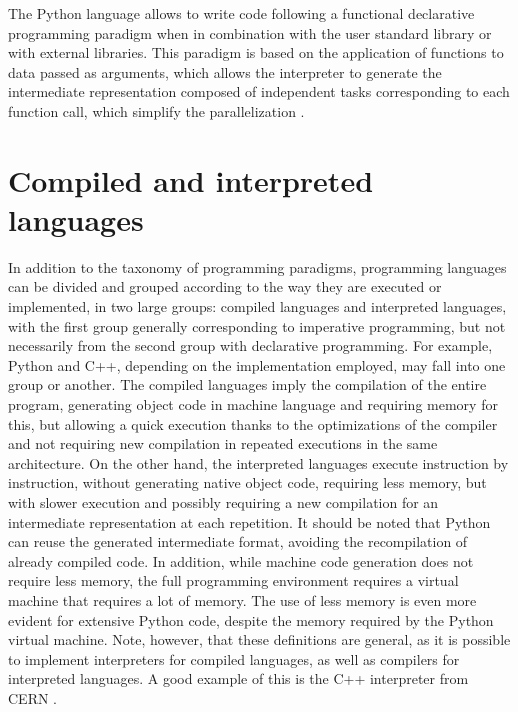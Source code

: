 The Python language allows to write code following a functional declarative programming paradigm when in combination with the user standard library or with external libraries. This paradigm is based on the application of functions to data passed as arguments, which allows the interpreter to generate the intermediate representation composed of independent tasks corresponding to each function call, which simplify the parallelization \cite {Singh2010}.

%
%
%
\section{Compiled and interpreted languages}

In addition to the taxonomy of programming paradigms, programming languages can be divided and grouped according to the way they are executed or implemented, in two large groups: compiled languages and interpreted languages, with the first group generally corresponding to imperative programming, but not necessarily from the second group with declarative programming. For example, Python and C++, depending on the implementation employed, may fall into one group or another. The compiled languages imply the compilation of the entire program, generating object code in machine language and requiring memory for this, but allowing a quick execution thanks to the optimizations of the compiler and not requiring new compilation in repeated executions in the same architecture. On the other hand, the interpreted languages execute instruction by instruction, without generating native object code, requiring less memory, but with slower execution and possibly requiring a new compilation for an intermediate representation at each repetition. It should be noted that Python can reuse the generated intermediate format, avoiding the recompilation of already compiled code. In addition, while machine code generation does not require less memory, the full programming environment requires a virtual machine that requires a lot of memory. The use of less memory is even more evident for extensive Python code, despite the memory required by the Python virtual machine. Note, however, that these definitions are general, as it is possible to implement interpreters for compiled languages, as well as compilers for interpreted languages. A good example of this is the C++ interpreter from CERN \cite {Vasilev2012}.

